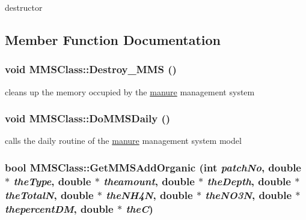 destructor 

\subsection{Member Function Documentation}
\hypertarget{class_m_m_s_class_a78c62051e79fbcc96544b37f71d19852}{
\subsubsection[{Destroy\_\-MMS}]{\setlength{\rightskip}{0pt plus 5cm}void MMSClass::Destroy\_\-MMS ()}}
\label{class_m_m_s_class_a78c62051e79fbcc96544b37f71d19852}


cleans up the memory occupied by the \hyperlink{classmanure}{manure} management system \hypertarget{class_m_m_s_class_a1876166aaad56d81c6144ddf53bab15c}{
\subsubsection[{DoMMSDaily}]{\setlength{\rightskip}{0pt plus 5cm}void MMSClass::DoMMSDaily ()}}
\label{class_m_m_s_class_a1876166aaad56d81c6144ddf53bab15c}


calls the daily routine of the \hyperlink{classmanure}{manure} management system model \hypertarget{class_m_m_s_class_a4ebfe5cbd23fa7d45df7ca9ddb226fe2}{
\subsubsection[{GetMMSAddOrganic}]{\setlength{\rightskip}{0pt plus 5cm}bool MMSClass::GetMMSAddOrganic (int {\em patchNo}, \/  double $\ast$ {\em theType}, \/  double $\ast$ {\em theamount}, \/  double $\ast$ {\em theDepth}, \/  double $\ast$ {\em theTotalN}, \/  double $\ast$ {\em theNH4N}, \/  double $\ast$ {\em theNO3N}, \/  double $\ast$ {\em thepercentDM}, \/  double $\ast$ {\em theC})}}
\label{class_m_m_s_class_a4ebfe5cbd23fa7d45df7ca9ddb226fe2}


